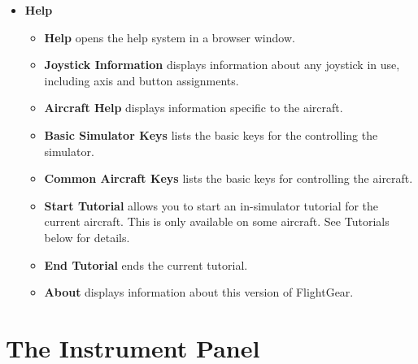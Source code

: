 \begin{itemize}
 \item \textbf{Help}
 \begin{itemize}
 \item \textbf{Help} opens the help system in a browser window.
 \item \textbf{Joystick Information} displays information about any joystick
 in use, including axis and button assignments.
 \item \textbf{Aircraft Help} displays information specific to the aircraft.
 \item \textbf{Basic Simulator Keys} lists the basic keys for the controlling the
simulator.
 \item \textbf{Common Aircraft Keys} lists the basic keys for controlling the
aircraft.
 \item \textbf{Start Tutorial} allows you to start an in-simulator tutorial for
 the current aircraft.
 This is only available on some aircraft. See Tutorials below for details.
 \item \textbf{End Tutorial} ends the current tutorial.
 \item \textbf{About} displays information about this version of FlightGear.
 \end{itemize}
\end{itemize}

\section{The Instrument Panel}

 \centerline{}

